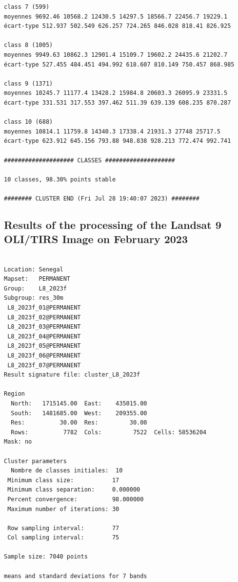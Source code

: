 \documentclass[earth,article,accept,pdftex,moreauthors]{Definitions/mdpi}
\begin{document}
{\begin{scriptsize}
\begin{verbatim}
class 7 (599)
moyennes 9692.46 10568.2 12430.5 14297.5 18566.7 22456.7 19229.1
écart-type 512.937 502.549 626.257 724.265 846.028 818.41 826.925

class 8 (1005)
moyennes 9949.63 10862.3 12901.4 15109.7 19602.2 24435.6 21202.7
écart-type 527.455 484.451 494.992 618.607 810.149 750.457 868.985

class 9 (1371)
moyennes 10245.7 11177.4 13428.2 15984.8 20603.3 26095.9 23331.5
écart-type 331.531 317.553 397.462 511.39 639.139 608.235 870.287

class 10 (688)
moyennes 10814.1 11759.8 14340.3 17338.4 21931.3 27748 25717.5
écart-type 623.912 645.156 793.88 948.838 928.213 772.474 992.741

#################### CLASSES ####################

10 classes, 98.30% points stable

######## CLUSTER END (Fri Jul 28 19:40:07 2023) ########

\end{verbatim}
\end{scriptsize}

\subsection[\appendixname~\thesubsection]{Results of the processing of the Landsat 9 OLI/TIRS Image on February 2023}
\begin{scriptsize}
\begin{verbatim}

Location: Senegal
Mapset:   PERMANENT
Group:    L8_2023f
Subgroup: res_30m
 L8_2023f_01@PERMANENT
 L8_2023f_02@PERMANENT
 L8_2023f_03@PERMANENT
 L8_2023f_04@PERMANENT
 L8_2023f_05@PERMANENT
 L8_2023f_06@PERMANENT
 L8_2023f_07@PERMANENT
Result signature file: cluster_L8_2023f

Region
  North:   1715145.00  East:    435015.00
  South:   1481685.00  West:    209355.00
  Res:          30.00  Res:         30.00
  Rows:          7782  Cols:         7522  Cells: 58536204
Mask: no

Cluster parameters
  Nombre de classes initiales: 	10
 Minimum class size:           17
 Minimum class separation:     0.000000
 Percent convergence:          98.000000
 Maximum number of iterations: 30

 Row sampling interval:        77
 Col sampling interval:        75

Sample size: 7040 points

means and standard deviations for 7 bands


\end{verbatim}
\end{scriptsize}}
\end{document}
